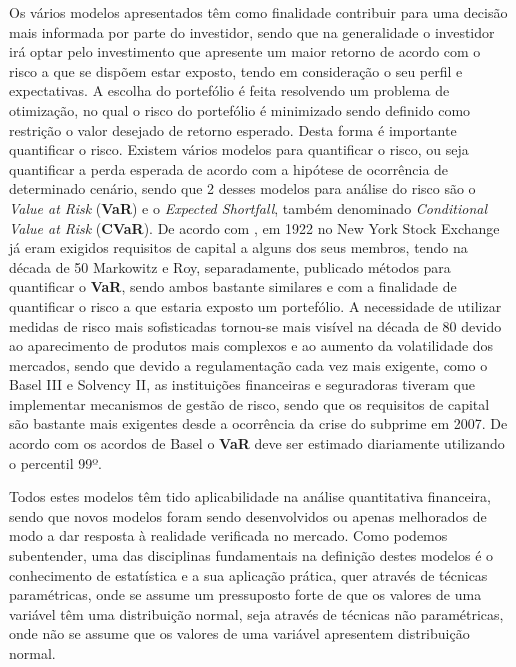 \documentclass[
  12pt,
  a4paper,
  openany]{book}
\theoremstyle{definition}
\theoremstyle{definition}
\theoremstyle{definition}
\theoremstyle{remark}
\begin{document}
Os vários modelos apresentados têm como finalidade contribuir para uma decisão mais informada por parte do investidor, sendo que na generalidade o investidor irá optar pelo investimento que apresente um maior retorno de acordo com o risco a que se dispõem estar exposto, tendo em consideração o seu perfil e expectativas. A escolha do portefólio é feita resolvendo um problema de otimização, no qual o risco do portefólio é minimizado sendo definido como restrição o valor desejado de retorno esperado. Desta forma é importante quantificar o risco. Existem vários modelos para quantificar o risco, ou seja quantificar a perda esperada de acordo com a hipótese de ocorrência de determinado cenário, sendo que 2 desses modelos para análise do risco são o \emph{Value at Risk} (\textbf{VaR}) e o \emph{Expected Shortfall}, também denominado \emph{Conditional Value at Risk} (\textbf{CVaR}). De acordo com \citet{HistVaR}, em 1922 no New York Stock Exchange já eram exigidos requisitos de capital a alguns dos seus membros, tendo na década de 50 Markowitz e Roy, separadamente, publicado métodos para quantificar o \textbf{VaR}, sendo ambos bastante similares e com a finalidade de quantificar o risco a que estaria exposto um portefólio. A necessidade de utilizar medidas de risco mais sofisticadas tornou-se mais visível na década de 80 devido ao aparecimento de produtos mais complexos e ao aumento da volatilidade dos mercados, sendo que devido a regulamentação cada vez mais exigente, como o Basel III e Solvency II, as instituições financeiras e seguradoras tiveram que implementar mecanismos de gestão de risco, sendo que os requisitos de capital são bastante mais exigentes desde a ocorrência da crise do subprime em 2007. De acordo com os acordos de Basel o \textbf{VaR} deve ser estimado diariamente utilizando o percentil 99º.

Todos estes modelos têm tido aplicabilidade na análise quantitativa financeira, sendo que novos modelos foram sendo desenvolvidos ou apenas melhorados de modo a dar resposta à realidade verificada no mercado. Como podemos subentender, uma das disciplinas fundamentais na definição destes modelos é o conhecimento de estatística e a sua aplicação prática, quer através de técnicas paramétricas, onde se assume um pressuposto forte de que os valores de uma variável têm uma distribuição normal, seja através de técnicas não paramétricas, onde não se assume que os valores de uma variável apresentem distribuição normal.
\end{document}
